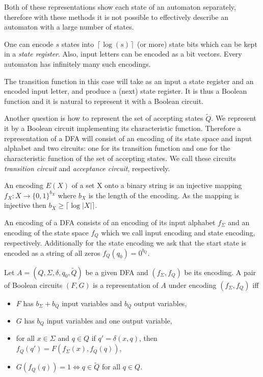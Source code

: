\documentclass[copyright, creativecommons]{eptcs}
\newenvironment{definition}[1][Definition]{\begin{trivlist}
\item[\hskip \labelsep {\bfseries #1}]}{\end{trivlist}}
\begin{document}
Both of these representations show each state of an automaton separately, therefore with these methods
it is not possible to effectively describe an automaton with a large number of states.

One can encode $s$ states into $\left\lceil\log(s)\right\rceil$ (or more) state bits which can be kept in a
 \textit{state register}. Also, input letters can be encoded as a bit vectors. Every automaton
has infinitely many such encodings.

The transition function in this case will take as an input a state register and
an encoded input letter, and produce a (next) state register.
It is thus a Boolean function and it is natural to represent it with a Boolean circuit.

Another question is how to represent the set of accepting states $\tilde{Q}$. We represent it
by a Boolean circuit implementing its characteristic function.
Therefore a representation of
a DFA will consist of an encoding of its state space and input alphabet and two circuits:
one for its transition function and one for the characteristic function
of the set of accepting states.
We call these circuits \textit{transition circuit} and \textit{acceptance circuit}, respectively.


An encoding $E(X)$ of a set X onto a binary string is an injective mapping $f_X:X\rightarrow \{0, 1\}^{b_X}$
where $b_X$ is the length of the encoding. As the mapping is injective then $b_X\geq\lceil\log{|X|}\rceil$.

An encoding of a DFA consists of an encoding of its input alphabet $f_\Sigma$ and an encoding of the state space $f_Q$
which we call input encoding and state encoding, respectively. Additionally for the state encoding
we ask that the start state is encoded as a string of all zeros $f_Q(q_0) = 0^{b_Q}$.


\begin{definition}
Let $A=(Q,\Sigma,\delta,q_0,\tilde{Q})$ be a given DFA and $(f_\Sigma, f_Q)$ be its encoding.
A pair of Boolean circuits $(F, G)$ is a representation of $A$ under encoding $(f_\Sigma, f_Q)$ iff
\begin{itemize}
\item $F$ has $b_\Sigma+b_Q$ input variables and $b_Q$ output variables,
\item $G$ has $b_Q$ input variables and one output variable,
\item for all $x\in \Sigma$ and $q\in Q$ if $q'=\delta(x, q)$, then $f_Q(q')=F(f_\Sigma(x),f_Q(q))$,
\item $G(f_Q(q))=1 \iff q\in \tilde{Q}$ for all $q\in Q$.
\end{itemize}
\end{definition}
\end{document}
